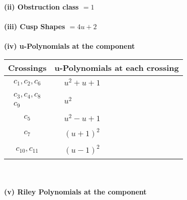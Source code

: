 \documentclass[1p]{elsarticle_modified}
\theoremstyle{definition}
\begin{document}
\flushleft \textbf{(ii) Obstruction class $= 1$}\\~\\
\flushleft \textbf{(iii) Cusp Shapes $= 4 u+2$}\\~\\
\newpage\renewcommand{\arraystretch}{1}
\flushleft \textbf{(iv) u-Polynomials at the component}\newline \\
\begin{tabular}{m{50pt}|m{274pt}}
Crossings & \hspace{64pt}u-Polynomials at each crossing \\
\hline $$\begin{aligned}c_{1},c_{2},c_{6}\end{aligned}$$&$\begin{aligned}
&u^2+u+1
\end{aligned}$\\
\hline $$\begin{aligned}c_{3},c_{4},c_{8}\\c_{9}\end{aligned}$$&$\begin{aligned}
&u^2
\end{aligned}$\\
\hline $$\begin{aligned}c_{5}\end{aligned}$$&$\begin{aligned}
&u^2- u+1
\end{aligned}$\\
\hline $$\begin{aligned}c_{7}\end{aligned}$$&$\begin{aligned}
&(u+1)^2
\end{aligned}$\\
\hline $$\begin{aligned}c_{10},c_{11}\end{aligned}$$&$\begin{aligned}
&(u-1)^2
\end{aligned}$\\
\hline
\end{tabular}\\~\\
\newpage\renewcommand{\arraystretch}{1}
\flushleft \textbf{(v) Riley Polynomials at the component}\newline \\
\end{document}
